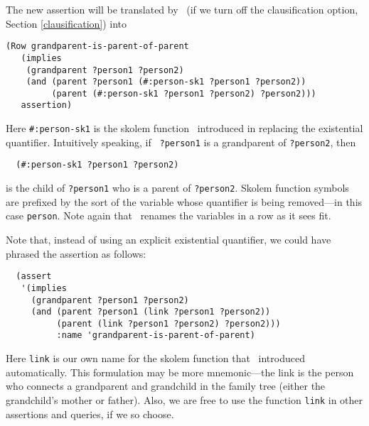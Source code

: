 The new  assertion will be translated by \snark\  (if we turn off the
clausification option, Section \ref{clausification}) into
\begin{verbatim}
(Row grandparent-is-parent-of-parent
   (implies
    (grandparent ?person1 ?person2)
    (and (parent ?person1 (#:person-sk1 ?person1 ?person2))
         (parent (#:person-sk1 ?person1 ?person2) ?person2)))
   assertion)
\end{verbatim}
Here \verb'#:person-sk1' is the skolem function \snark\  introduced in
replacing the existential quantifier.  Intuitively speaking, if {\tt
?person1} is a grandparent of {\tt ?person2}, then
\begin{verbatim}
  (#:person-sk1 ?person1 ?person2)
\end{verbatim}
is the child of {\tt ?person1} who is a parent of {\tt ?person2}.
Skolem function symbols are prefixed by the sort of the variable whose
quantifier is being removed---in this case {\tt person}.  Note again
that \snark\  renames the variables in a row as it sees fit.

Note that, instead of using an explicit existential quantifier, we
could have phrased the assertion as follows:
\begin{verbatim}
  (assert
   '(implies
     (grandparent ?person1 ?person2)
     (and (parent ?person1 (link ?person1 ?person2))
          (parent (link ?person1 ?person2) ?person2)))
          :name 'grandparent-is-parent-of-parent)
\end{verbatim}
Here {\tt link} is our own name for the skolem function that \snark\
introduced automatically.  This formulation may be more mnemonic---the
link is the person who connects a grandparent and grandchild in the
family tree (either the grandchild's mother or father).  Also, we are
free to use the function {\tt link} in other assertions and queries,
if we so choose.

